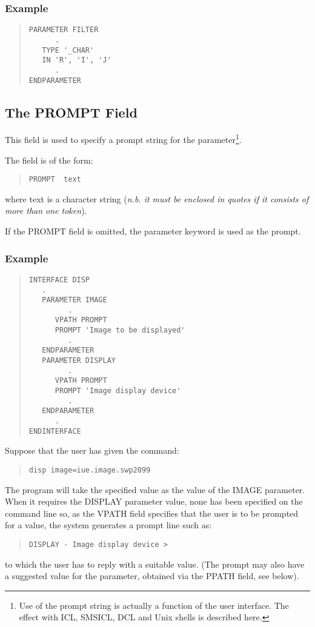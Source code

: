 \documentclass[twoside,11pt]{article}
\newcommand{\xlabel}[1]{}
\renewcommand{\_}{\texttt{\symbol{95}}}
\begin{document}
\subsubsection*{Example}
\begin{quote} \begin{verbatim}
PARAMETER FILTER
      .
   TYPE '_CHAR'
   IN 'R', 'I', 'J'
      .
ENDPARAMETER
\end{verbatim} \end{quote}

\subsection{The PROMPT Field\xlabel{the_prompt_field}}

This field is used to specify a prompt string for the parameter\footnote{Use
of the prompt string is actually a function of the user interface.
The effect with ICL, SMSICL, DCL and Unix shells is described here.}.

The field is of the form:
\begin{quote} \begin{verbatim}
PROMPT  text
\end{verbatim} \end{quote}
where text is a character string ({\em n.b. it must be enclosed in quotes
if it consists of more than one token}\/).

If the PROMPT field is omitted, the parameter keyword is used as the prompt.

\subsubsection*{Example}
\begin{quote} \begin{verbatim}
INTERFACE DISP
   .
   PARAMETER IMAGE
         .
      VPATH PROMPT
      PROMPT 'Image to be displayed'
         .
   ENDPARAMETER
   PARAMETER DISPLAY
         .
      VPATH PROMPT
      PROMPT 'Image display device'
         .
   ENDPARAMETER
      .
ENDINTERFACE
\end{verbatim} \end{quote}
Suppose that the user has given the command:
\begin{quote} \begin{verbatim}
disp image=iue.image.swp2099
\end{verbatim} \end{quote}
The program will take the specified value as the value of the IMAGE parameter.
When it requires the DISPLAY parameter value, none has been specified on
the command line so, as the VPATH field specifies that the user is
to be prompted for a value, the system generates a prompt line such
as:
\begin{quote} \begin{verbatim}
DISPLAY - Image display device >
\end{verbatim} \end{quote}
to which the user has to reply with a suitable value. (The prompt may
also have a suggested value for the parameter, obtained via the PPATH
field, see below).
\end{document}
